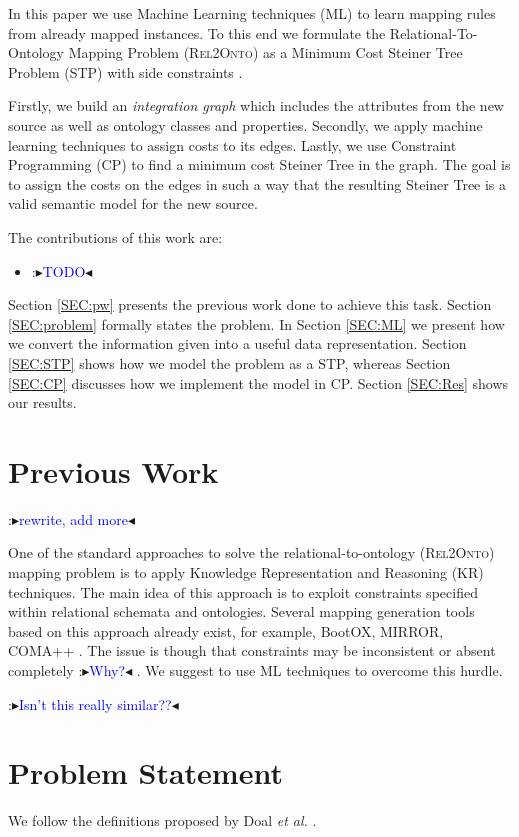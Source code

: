 \documentclass[letterpaper]{article} %
\newcommand{\authornote}[3]{
  {\fbox{\sc 
  #1}:$\blacktriangleright$\textcolor{#2}{\small{#3}}$\blacktriangleleft$}%
}
\newcommand{\ddg}[1]{\authornote{DDG}{blue}{#1}}
\newcommand{\relonto}{\textsc{Rel2Onto}}
\newcommand{\etal}{\textit{et al.}}
\begin{document}
In this paper we use Machine Learning techniques (ML) to learn mapping rules 
from already mapped instances. To this end we formulate the 
Relational-To-Ontology Mapping Problem (\relonto{})
as a Minimum Cost Steiner Tree Problem (STP) with side constraints 
\cite{deuna2016steiner}.

Firstly, we build an \emph{integration graph} which includes the 
attributes from the new source as well as ontology classes and properties. 
Secondly, we apply machine learning techniques to 
assign costs to its edges. 
Lastly, we use Constraint Programming (CP) to 
find a minimum cost Steiner Tree in the graph. The goal is to assign the costs 
on the edges in such a way that the resulting Steiner Tree is a valid semantic 
model for the new source. 

The contributions of this work are:
\begin{itemize}
	\item \ddg{TODO}
\end{itemize}

Section \ref{SEC:pw} presents the previous work done to achieve this task. 
Section \ref{SEC:problem} formally states the problem. 
In Section \ref{SEC:ML} we present how we convert the information given into a 
useful data representation. 
Section \ref{SEC:STP} shows how we model the problem as a STP, 
whereas Section \ref{SEC:CP} discusses how we implement the model in CP. 
Section \ref{SEC:Res} shows our results. 

\section{Previous Work \label{SEC:pw}}
\ddg{rewrite, add more}
One of the standard approaches to solve the relational-to-ontology (\relonto{})
mapping problem is to apply Knowledge Representation and Reasoning (KR)
techniques. The main idea of this approach is to exploit constraints specified 
within relational schemata and ontologies. Several mapping generation
tools based on this approach already exist, for example, BootOX, MIRROR,
COMA++ \cite{pinkel2016rodi}. The issue is though that constraints may be 
inconsistent or absent completely \ddg{Why?}. We suggest to use ML techniques 
to overcome this hurdle.

\cite{taheriyan2016learning} \ddg{Isn't this really similar??}

\section{Problem Statement \label{SEC:problem}}
We follow the definitions proposed by Doal \etal{} \cite{doan2012principles}.
\end{document}
